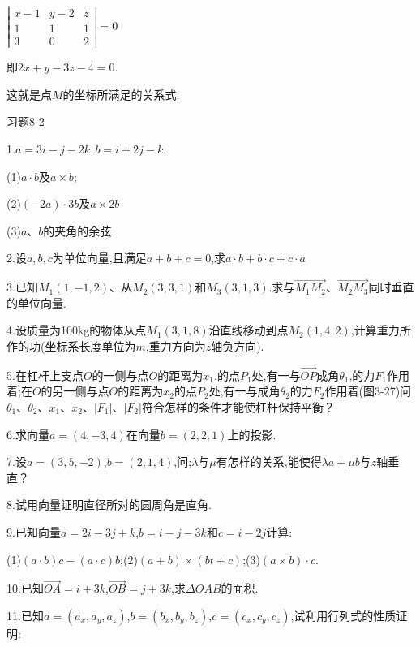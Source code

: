 \documentclass[oneside]{book}
\begin{document}
$\left|\begin{array}{ccc}{x-1} & {y-2} & {z} \\ {1} & {1} & {1} \\ {3} & {0} & {2}\end{array}\right|=0$

即$2x + y - 3z - 4 = 0.$

这就是点$M$的坐标所满足的关系式.

习题8-2

1.$a = 3i - j - 2k,b = i + 2j - k$.

(1)$a \cdot b$及$a \times b$;

(2)$( - 2a) \cdot 3b$及$a \times 2b$

(3)$a$、$b$的夹角的余弦

2.设$a,b,c$为单位向量,且满足$a + b + c = 0$,求$a \cdot b + b \cdot c + c \cdot a$

3.已知${M_1}\left( {1, - 1,2} \right)$、从${M_2}(3,3,1)$和${M_3}\left( {3,1,3} \right)$.求与$\overrightarrow {{M_1}{M_2}} $、$\overrightarrow {{M_2}{M_3}} $同时垂直的单位向量.

4.设质量为100kg的物体从点${M_1}(3,1,8)$沿直线移动到点${M_2}(1,4,2)$,计算重力所作的功(坐标系长度单位为$m$,重力方向为$z$轴负方向).

5.在杠杆上支点$O$的一侧与点$O$的距离为${x_1}$,的点${P_1}$处,有一与$\overrightarrow {OP} $成角${\theta _1}$,的力${F_1}$作用着;在$O$的另一侧与点$O$的距离为${x_2}$的点${P_2}$处,有一与成角${\theta _2}$的力${F_2}$作用着(图3-27)问${\theta _1}$、${\theta _2}$、${x_1}$、${x_2}$、$\left| {{F_1}} \right|$、$\left| {{F_2}} \right|$符合怎样的条件才能使杠杆保持平衡？

6.求向量$a = \left( {4, - 3,4} \right)$在向量$b = (2,2,1)$上的投影.

7.设$a = (3,5, - 2)$,$b = \left( {2,1,4} \right)$,问;$\lambda $与$\mu $有怎样的关系,能使得$\lambda a + \mu b$与$z$轴垂直？

8.试用向量证明直径所对的圆周角是直角.

9.已知向量$a = 2i - 3j + k$,$b = i - j - 3k$和$c = i - 2j$计算:

(1)$\left( {a \cdot b} \right)c - \left( {a \cdot c} \right)b$;(2)$\left( {a + b} \right) \times \left( {bt + c} \right)$;(3)$\left( {a \times b} \right) \cdot c$.

10.已知$\overrightarrow {OA}  = i + 3k$,$\overrightarrow {OB}  = j + 3k$,求$\Delta OAB$的面积.

11.已知$a = ({a_x},{a_y},{a_z})$,$b = \left( {{b_x},{b_y},{b_z}} \right)$,$c = ({c_x},{c_y},{c_z})$,试利用行列式的性质证明:
\end{document}
